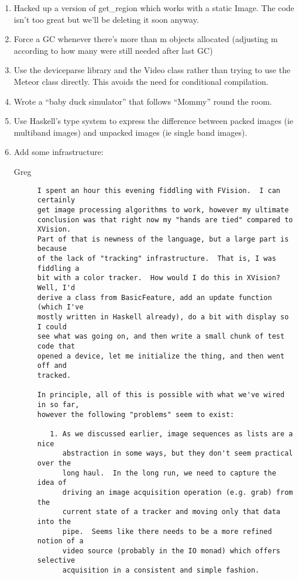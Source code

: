 \begin{enumerate}
\item
  Hacked up a version of get\_region which works with a static
  Image.  The code isn't too great but we'll be deleting it soon 
  anyway.

\item
  Force a GC whenever there's more than m objects allocated
  (adjusting m according to how many were still needed after
   last GC)

\item
  Use the deviceparse library and the Video class rather than
  trying to use the Meteor class directly.
  This avoids the need for conditional compilation.

\item
  Wrote a ``baby duck simulator'' that follows ``Mommy'' round the room.

\item
  Use Haskell's type system to express the difference between
  packed images (ie multiband images) and unpacked images (ie single 
  band images).

\item
Add some infrastructure:

\begin{description}
\item[Greg]
\begin{verbatim}
I spent an hour this evening fiddling with FVision.  I can certainly
get image processing algorithms to work, however my ultimate
conclusion was that right now my "hands are tied" compared to XVision.
Part of that is newness of the language, but a large part is because
of the lack of "tracking" infrastructure.  That is, I was fiddling a
bit with a color tracker.  How would I do this in XVision?  Well, I'd
derive a class from BasicFeature, add an update function (which I've
mostly written in Haskell already), do a bit with display so I could
see what was going on, and then write a small chunk of test code that
opened a device, let me initialize the thing, and then went off and
tracked.

In principle, all of this is possible with what we've wired in so far,
however the following "problems" seem to exist:

   1. As we discussed earlier, image sequences as lists are a nice
      abstraction in some ways, but they don't seem practical over the
      long haul.  In the long run, we need to capture the idea of
      driving an image acquisition operation (e.g. grab) from the
      current state of a tracker and moving only that data into the
      pipe.  Seems like there needs to be a more refined notion of a
      video source (probably in the IO monad) which offers selective
      acquisition in a consistent and simple fashion.


\end{verbatim}
\end{description}
\end{enumerate}
